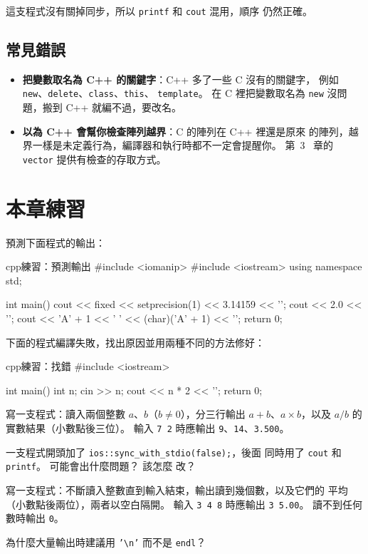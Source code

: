 
這支程式沒有關掉同步，所以 \texttt{printf} 和 \texttt{cout} 混用，順序
仍然正確。

\subsection{常見錯誤}

\begin{itemize}
\item \textbf{把變數取名為 C++ 的關鍵字}：C++ 多了一些 C 沒有的關鍵字，
例如 \texttt{new}、\texttt{delete}、\texttt{class}、\texttt{this}、
\texttt{template}。 在 C 裡把變數取名為 \texttt{new} 沒問題，搬到 C++
就編不過，要改名。
\item \textbf{以為 C++ 會幫你檢查陣列越界}：C 的陣列在 C++ 裡還是原來
的陣列，越界一樣是未定義行為，編譯器和執行時都不一定會提醒你。 第~3~
章的 \texttt{vector} 提供有檢查的存取方式。
\end{itemize}

\section{本章練習}
\label{sec:ch1-exercises}

\begin{drills}[label=drills:ch1]
\item 預測下面程式的輸出：
\begin{code}{cpp}{練習：預測輸出}
#include <iomanip>
#include <iostream>
using namespace std;

int main() {
    cout << fixed << setprecision(1) << 3.14159 << '\n';
    cout << 2.0 << '\n';
    cout << 'A' + 1 << ' ' << (char)('A' + 1) << '\n';
    return 0;
}
\end{code}
\item 下面的程式編譯失敗，找出原因並用兩種不同的方法修好：
\begin{code}{cpp}{練習：找錯}
#include <iostream>

int main() {
    int n;
    cin >> n;
    cout << n * 2 << '\n';
    return 0;
}
\end{code}
\item 寫一支程式：讀入兩個整數 $a$、$b$（$b \neq 0$），分三行輸出
$a + b$、$a \times b$，以及 $a / b$ 的實數結果（小數點後三位）。 輸入
\texttt{7 2} 時應輸出 \texttt{9}、\texttt{14}、\texttt{3.500}。
\item 一支程式開頭加了 \texttt{ios::sync\_with\_stdio(false);}，後面
同時用了 \texttt{cout} 和 \texttt{printf}。 可能會出什麼問題？ 該怎麼
改？
\item 寫一支程式：不斷讀入整數直到輸入結束，輸出讀到幾個數，以及它們的
平均（小數點後兩位），兩者以空白隔開。 輸入 \texttt{3 4 8} 時應輸出
\texttt{3 5.00}。 讀不到任何數時輸出 \texttt{0}。
\item 為什麼大量輸出時建議用 \texttt{'\textbackslash n'} 而不是
\texttt{endl}？
\end{drills}

